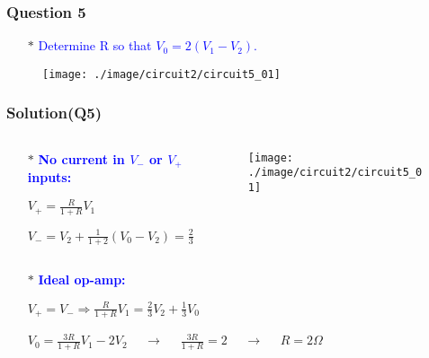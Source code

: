 \documentclass{beamer}
\newcommand{\blue}[1]{\textcolor{blue}{#1}}
\begin{document}

\begin{frame}
\frametitle{Question 5}

\begin{itemize} \itemsep1pt \parskip0pt 
  \item[$\ast$] \blue{Determine R so that $V_0 = 2(V_1 - V_2)$.}
\end{itemize}


\begin{figure}[H]
  \centering
  \texttt{[image: ./image/circuit2/circuit5\_01]}
\end{figure}


\end{frame}


\begin{frame}
\frametitle{Solution(Q5)}
\begin{columns}
\begin{column}{7.6cm}
\begin{itemize} \itemsep1pt \parskip0pt 
  \item[$\ast$] \blue{\bf No current in $V_-$ or $V_+$ inputs:}
  \item[] $V_+=\frac{R}{1+R}V_1$
  \item[] $V_-=V_2 + \frac{1}{1+2}(V_0-V_2) = \frac{2}{3}V_2 + \frac{1}{3}V_0$
\end{itemize}
\end{column}



\begin{column}{4cm}
\begin{figure}[H]
  \centering
  \texttt{[image: ./image/circuit2/circuit5\_01]}
\end{figure}
\end{column}
\end{columns}

\begin{itemize} \itemsep1pt \parskip0pt 
  \item[$\ast$] \blue{\bf Ideal op-amp:}
  \item[] $V_+ = V_- \Rightarrow \frac{R}{1+R}V_1 = \frac{2}{3}V_2 + \frac{1}{3}V_0$
  \item[] $V_0 = \frac{3R}{1+R}V_1-2V_2$ ~~$\rightarrow$ ~~$\frac{3R}{1+R} = 2$ ~~$\rightarrow$ ~~$R = 2\Omega$
\end{itemize}

\end{frame}
\end{document}
